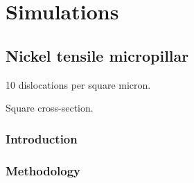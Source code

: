 \chapter{Simulations}\label{c:simulations}


\section{Nickel tensile micropillar}\label{s:nickelTensile}

10 dislocations per square micron.

Square cross-section.
\subsection{Introduction}
\subsection{Methodology}

